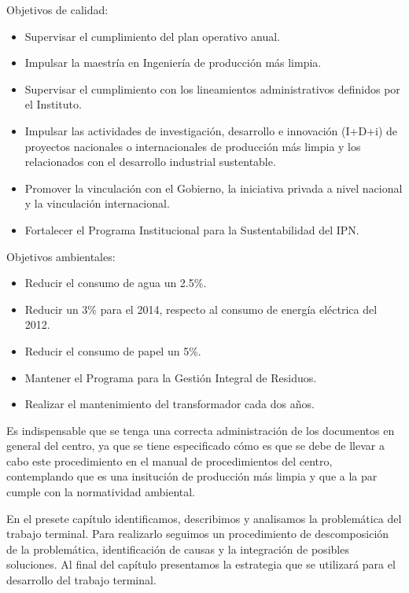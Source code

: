 Objetivos de calidad:

\begin{itemize}
	\item Supervisar el cumplimiento del plan operativo anual.
	\item Impulsar la maestría en Ingeniería de producción más limpia.
	\item Supervisar el cumplimiento con los lineamientos administrativos definidos por el Instituto.
	\item Impulsar las actividades de investigación, desarrollo e innovación (I+D+i) de proyectos nacionales o internacionales de producción más limpia y los relacionados con el desarrollo industrial sustentable.
 \item Promover la vinculación con el Gobierno, la iniciativa privada a nivel nacional y la vinculación internacional.
	\item Fortalecer el Programa Institucional para la Sustentabilidad del IPN.
\end{itemize}

Objetivos ambientales:

\begin{itemize}
	\item Reducir el consumo de agua un 2.5\%.
	\item Reducir un 3\% para el 2014, respecto al consumo de energía eléctrica del 2012.
	\item Reducir el consumo de papel un 5\%.
	\item Mantener el Programa para la Gestión Integral de Residuos.
	\item Realizar el mantenimiento del transformador cada dos años.
\end{itemize}

Es indispensable que se tenga una correcta administración de los documentos en general del centro, ya que se tiene especificado cómo es que se debe de llevar a cabo este procedimiento en el manual de procedimientos del centro, contemplando que es una insitución de producción más limpia y que a la par cumple con la normatividad ambiental.




En el presete capítulo identificamos, describimos y analisamos la problemática del trabajo terminal. Para realizarlo seguimos un procedimiento de descomposición de la problemática, identificación de causas y la integración de posibles soluciones. Al final del capítulo presentamos la estrategia que se utilizará para el desarrollo del trabajo terminal. 
